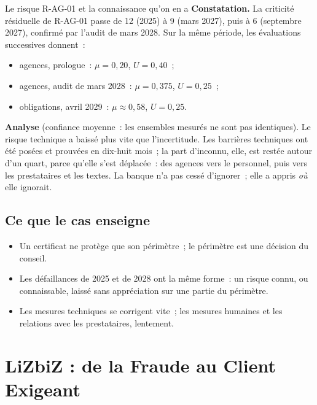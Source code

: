 \begin{boxlecture}{Le risque R-AG-01 et la connaissance qu'on en a}
\textbf{Constatation.} La criticité résiduelle de R-AG-01 passe de 12
(2025) à 9 (mars 2027), puis à 6 (septembre 2027), confirmé par l'audit de
mars 2028. Sur la même période, les évaluations successives donnent~:
\begin{itemize}
    \item agences, prologue~: $\mu = 0{,}20$, $U = 0{,}40$~;
    \item agences, audit de mars 2028~: $\mu = 0{,}375$, $U = 0{,}25$~;
    \item obligations, avril 2029~: $\mu \approx 0{,}58$, $U = 0{,}25$.
\end{itemize}

\textbf{Analyse} (confiance moyenne~: les ensembles mesurés ne sont pas
identiques). Le risque technique a baissé plus vite que l'incertitude. Les
barrières techniques ont été posées et prouvées en dix-huit mois~; la part
d'inconnu, elle, est restée autour d'un quart, parce qu'elle s'est déplacée~:
des agences vers le personnel, puis vers les prestataires et les textes. La
banque n'a pas cessé d'ignorer~; elle a appris \emph{où} elle ignorait.
\end{boxlecture}

\subsection{Ce que le cas enseigne}

\begin{itemize}
    \item Un certificat ne protège que son périmètre~; le périmètre est une
          décision du conseil.
    \item Les défaillances de 2025 et de 2028 ont la même forme~: un risque
          connu, ou connaissable, laissé sans appréciation sur une partie du
          périmètre.
    \item Les mesures techniques se corrigent vite~; les mesures humaines et
          les relations avec les prestataires, lentement.
\end{itemize}

\section{LiZbiZ : de la Fraude au Client Exigeant}
\label{sec:c14-lizbiz}

